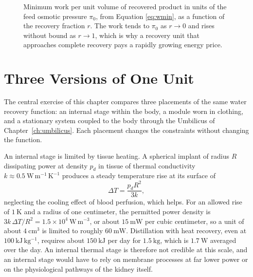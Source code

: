 \documentclass[11pt,openany]{book}
\theoremstyle{definition}
\theoremstyle{remark}
\begin{document}
\begin{figure}[ht]
\centering
{}
\caption{Minimum work per unit volume of recovered product in units of the feed osmotic pressure $\pi_0$, from Equation \eqref{eq:wmin}, as a function of the recovery fraction $r$. The work tends to $\pi_0$ as $r\to0$ and rises without bound as $r\to1$, which is why a recovery unit that approaches complete recovery pays a rapidly growing energy price.}
\label{fig:wmin}
\end{figure}

\section{Three Versions of One Unit}

The central exercise of this chapter compares three placements of the same water recovery function: an internal stage within the body, a module worn in clothing, and a stationary system coupled to the body through the Umbilicus of Chapter~\ref{ch:umbilicus}. Each placement changes the constraints without changing the function.

An internal stage is limited by tissue heating. A spherical implant of radius $R$ dissipating power at density $p_d$ in tissue of thermal conductivity $k\approx0.5\ \mathrm{W\,m^{-1}\,K^{-1}}$ produces a steady temperature rise at its surface of
\begin{equation}
\Delta T=\frac{p_d R^{2}}{3k},
\label{eq:implantheat}
\end{equation}
neglecting the cooling effect of blood perfusion, which helps. For an allowed rise of $1\ \mathrm{K}$ and a radius of one centimeter, the permitted power density is $3k\,\Delta T/R^{2}=1.5\times10^{4}\ \mathrm{W\,m^{-3}}$, or about $15\ \mathrm{mW}$ per cubic centimeter, so a unit of about $4\ \mathrm{cm^{3}}$ is limited to roughly $60\ \mathrm{mW}$. Distillation with heat recovery, even at $100\ \mathrm{kJ\,kg^{-1}}$, requires about $150\ \mathrm{kJ}$ per day for $1.5\ \mathrm{kg}$, which is $1.7\ \mathrm{W}$ averaged over the day. An internal thermal stage is therefore not credible at this scale, and an internal stage would have to rely on membrane processes at far lower power or on the physiological pathways of the kidney itself.
\end{document}
